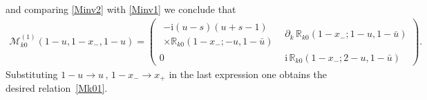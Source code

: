 \documentclass[a4paper,11pt]{article}
\renewcommand{\imath}{\mathrm{i}}
\numberwithin{equation}{section}
\begin{document}
and comparing \eqref{Minv2} with \eqref{Minv1} we conclude that
\begin{align} \nonumber
	\mathcal{M}^{(1)}_{k0}(1-u,1-x_-,1-u) =
	\left(
	\begin{array}{c|c}
		\begin{array}{l}
			-\imath(u-s)(u+s-1) \\ \times\mathbb{R}_{k0}(1-x_-;-u,1-\bar{u})
		\end{array} &
		\partial_k\,\mathbb{R}_{k0}(1-x_-;1-u,1-\bar{u})
		\\
		\hline
		0 &
		\imath\,\mathbb{R}_{k0}(1-x_-;2-u,1-\bar{u})
	\end{array}
	\right).
\end{align}
Substituting $1-u\to u \,, \, 1-x_-\to x_+$ in the last expression one obtains the desired relation~\eqref{Mk01}.
\end{document}
